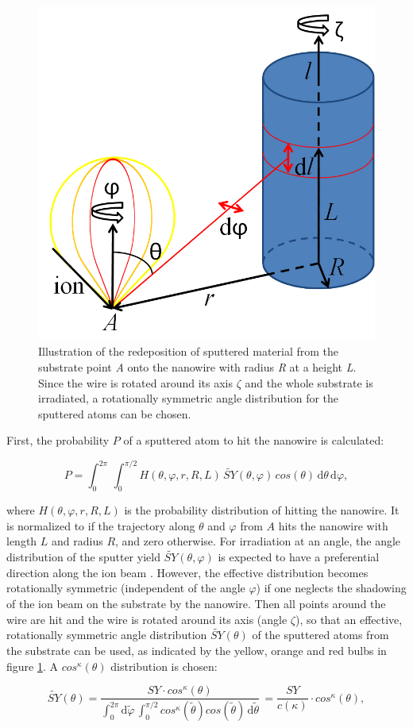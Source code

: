 \begin{figure}
	\centering
		\includegraphics[width=.4\textwidth]{images/redeposit.jpg}
	\caption{Illustration of the redeposition of sputtered material from the substrate point \emph{A} onto the nanowire with radius \emph{R} at a height \emph{L}. Since the wire is rotated around its axis $\zeta$ and the whole substrate is irradiated, a rotationally symmetric angle distribution for the sputtered atoms can be chosen.} 
	\label{redeposit}
\end{figure}

First, the probability $P$ of a sputtered atom to hit the nanowire is calculated:

\begin{equation}
\label{prob1}
P = \int_0^{2\pi} \! \,\int_0^{\pi/2} \!\! H(\theta,\varphi,r,R,L) \, \tilde{SY}(\theta,\varphi) \,cos(\theta)\,\mathrm{d}\theta \, \mathrm{d}\varphi,
\end{equation}

where $H(\theta,\varphi,r,R,L)$ is the probability distribution of hitting the nanowire. It is normalized to  if the trajectory along $\theta$ and $\varphi$ from $A$ hits the nanowire with length $L$ and radius $R$, and zero otherwise. For irradiation at an angle, the angle distribution of the sputter yield $\tilde{SY}(\theta,\varphi)$ is expected to have a preferential direction along the ion beam \cite{verdeil_angular_2008}. However, the effective distribution becomes rotationally symmetric (independent of the angle $\varphi$) if one neglects the shadowing of the ion beam on the substrate by the nanowire. Then all points around the wire are hit and the wire is rotated around its axis (angle $\zeta$), so that an effective, rotationally symmetric angle distribution $\tilde{SY}(\theta)$ of the sputtered atoms from the substrate can be used, as indicated by the yellow, orange and red bulbs in figure \ref{redeposit}. A $cos^\kappa(\theta)$ distribution is chosen: 

\begin{equation}
\tilde{SY}(\theta) = \frac{SY \cdot cos^\kappa(\theta)}{\int_0^{2\pi} \! \mathrm{d}\tilde\varphi \,\int_0^{\pi/2} \! cos^\kappa(\tilde\theta) cos(\tilde\theta)\,  \mathrm{d}\tilde\theta} \, = \frac{SY}{c(\kappa)} \cdot cos^\kappa(\theta) ,
\end{equation}

